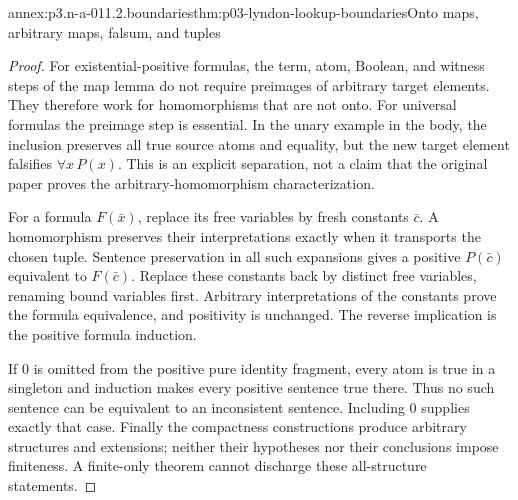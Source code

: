 \begin{annexitem}{annex:p3.n-a-011.2.boundaries}{thm:p03-lyndon-lookup-boundaries}{Onto maps, arbitrary maps, falsum, and tuples}
\begin{proof}
For existential-positive formulas, the term, atom, Boolean, and witness
steps of the map lemma do not require preimages of arbitrary target
elements. They therefore work for homomorphisms that are not onto.
For universal formulas the preimage step is essential. In the unary
example in the body, the inclusion preserves all true source atoms and
equality, but the new target element falsifies \(\forall x\,P(x)\).
This is an explicit separation, not a claim that the original paper
proves the arbitrary-homomorphism characterization.

For a formula \(F(\bar x)\), replace its free variables by fresh
constants \(\bar c\). A homomorphism preserves their interpretations
exactly when it transports the chosen tuple. Sentence preservation in
all such expansions gives a positive \(P(\bar c)\) equivalent to
\(F(\bar c)\). Replace these constants back by distinct free variables,
renaming bound variables first. Arbitrary interpretations of the
constants prove the formula equivalence, and positivity is unchanged.
The reverse implication is the positive formula induction.

If \(0\) is omitted from the positive pure identity fragment, every
atom is true in a singleton and induction makes every positive sentence
true there. Thus no such sentence can be equivalent to an inconsistent
sentence. Including \(0\) supplies exactly that case. Finally the
compactness constructions produce arbitrary structures and extensions;
neither their hypotheses nor their conclusions impose finiteness. A
finite-only theorem cannot discharge these all-structure statements.
\end{proof}
\end{annexitem}

